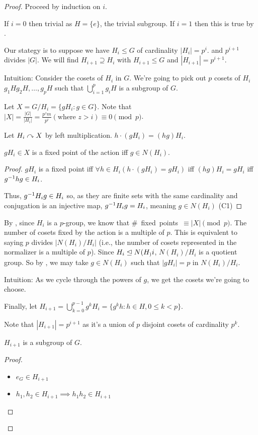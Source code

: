 \documentclass[notes.tex]{subfiles}
\begin{document}
\begin{proof}
	Proceed by induction on $i$.

	If $i=0$ then trivial as $H = \{e\}$, the trivial subgroup.
	If $i=1$ then this is true by .

	Our stategy is to suppose we have $H_i\le G$ of cardinality $|H_i| = p^i$.
	and $p^{i+1}$ divides $|G|$. We will find $H_{i+1} \supseteq H_{i}$ with $H_{i+1}\le G$ and $|H_{i+1}| = p^{i+1}$.

	Intuition: Consider the cosets of $H_i$ in $G$. We're going to pick out $p$ cosets of $H_i$ $g_1H g_2H, \ldots, g_pH$ such that $\bigcup_{i=1}^p g_iH$ is a subgroup of $G.$

	Let $X = G/H_i = \{gH_i : g\in G\}$. Note that $|X| = \frac{|G|}{|H_i|} = \frac{p^zm}{p^i} (\text{where }z > i) \equiv 0 \pmod p$.

	Let $H_i\curvearrowright X$ by left multiplication.
	$h\cdot (gH_i) = (hg)H_i$.

	\begin{claim}[1]
		$gH_i \in X$ is a fixed point of the action iff $g\in N(H_i)$.
	\end{claim}
	\begin{proof}
		$gH_i$ is a fixed point iff $\forall h\in H_i (h\cdot(gH_i) = gH_i)$
		iff $(hg)H_i = gH_i$
		iff ${g}^{-1}hg \in H_i$.

		Thus, ${g}^{-1}H_ig \in H_i$ so, as they are finite sets with the same cardinality and conjugation is an injective map, ${g}^{-1}H_ig = H_i$, meaning $g\in N(H_i)$
		\qedhere(C1)
	\end{proof}
	By , since $H_i$ is a $p$-group, we know that \#~fixed~points~$\equiv |X| \pmod p$.
	The number of cosets fixed by the action is a multiple of $p$. This is equivalent to saying $p$ divides $|N(H_i)/H_i|$ (i.e., the number of cosets represented in the normalizer is a multiple of $p$).
	Since $H_i \trianglelefteq N(H_)i$, $N(H_i)/H_i$ is a quotient group. So by , we may take $g\in N(H_i)$ such that $|gH_i| = p$ in $N(H_i)/H_i$.

	Intuition: As we cycle through the powers of $g$, we get the cosets we're going to choose.

	Finally, let $H_{i+1} = \bigcup_{k=0}^{p-1} g^kH_i = \{g^kh:h\in H, 0\le k < p\}$.

	Note that $|H_{i+1}| = p^{i+1}$ as it's a union of $p$ disjoint cosets of cardinality $p^k$.

	\begin{claim}[2]
		$H_{i+1}$ is a subgroup of $G$.
	\end{claim}
	\begin{proof}\leavevmode
	\begin{itemize}
		\item $e_G\in H_{i+1}$
		\item $h_1, h_2\in H_{i+1} \implies h_1h_2\in H_{i+1}$


\end{itemize}
\end{proof}
\end{proof}
\end{document}
